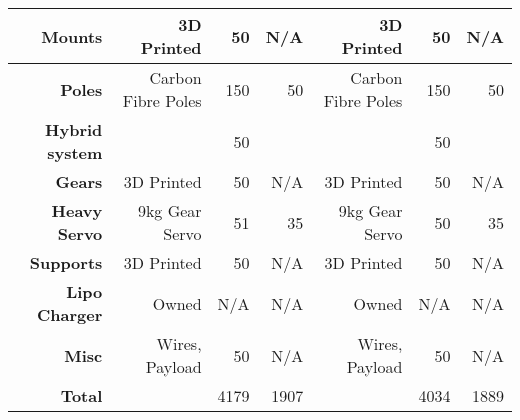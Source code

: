 \begin{landscape}
\begin{table}[!htbp]
\begin{tabular}{|r|r|r|r|r|r|r|}
		\textbf{Mounts} & 3D Printed & 50 & N/A & 3D Printed & 50 & N/A\\
		\hline
		\textbf{Poles} & Carbon Fibre Poles & 150 & 50 & Carbon Fibre Poles & 150 & 50\\
		\hline
		\textbf{Hybrid system} &  & 50 & & & 50 & \\
		\hline
		\textbf{Gears} & 3D Printed & 50 & N/A & 3D Printed & 50 & N/A\\
		\hline
		\textbf{Heavy Servo} & 9kg Gear Servo & 51 & 35 & 9kg Gear Servo & 50 & 35\\
		\hline
		\textbf{Supports} & 3D Printed & 50 & N/A & 3D Printed & 50 & N/A\\
		\hline
		\textbf{Lipo Charger} & Owned & N/A & N/A & Owned & N/A & N/A\\
		\hline
		\textbf{Misc} & Wires, Payload & 50 & N/A & Wires, Payload & 50 & N/A\\
		\hline
		\textbf{Total} & & 4179 & 1907 &  & 4034 & 1889\\
		\hline
	\end{tabular} 
	\label{tab:x8costs}
\end{table}
\end{landscape}

